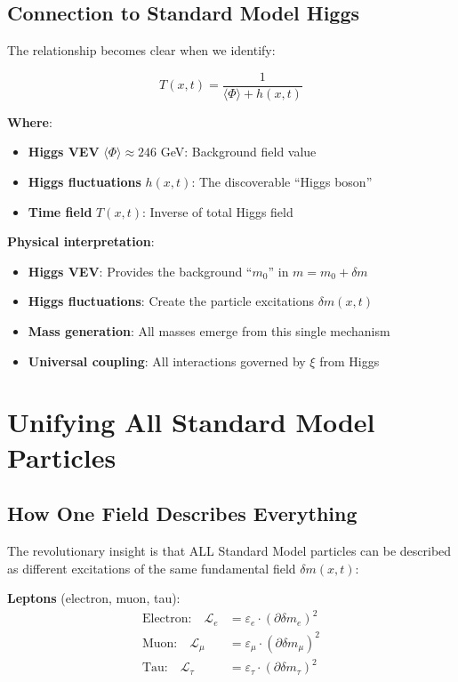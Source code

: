 \documentclass[12pt,a4paper]{article}
\newcommand{\Lag}{\mathcal{L}}
\newcommand{\deltam}{\delta m}
\newcommand{\xipar}{\xi}
\theoremstyle{definition}
\theoremstyle{remark}
\begin{document}
	\subsection{Connection to Standard Model Higgs}
	
	The relationship becomes clear when we identify:
	
	\begin{equation}
		T(x,t) = \frac{1}{\langle\Phi\rangle + h(x,t)}
	\end{equation}
	
	\textbf{Where}:
	\begin{itemize}
		\item \textbf{Higgs VEV} $\langle\Phi\rangle \approx 246$ GeV: Background field value
		\item \textbf{Higgs fluctuations} $h(x,t)$: The discoverable ``Higgs boson''
		\item \textbf{Time field} $T(x,t)$: Inverse of total Higgs field
	\end{itemize}
	
	\textbf{Physical interpretation}:
	\begin{itemize}
		\item \textbf{Higgs VEV}: Provides the background ``$m_0$'' in $m = m_0 + \deltam$
		\item \textbf{Higgs fluctuations}: Create the particle excitations $\deltam(x,t)$
		\item \textbf{Mass generation}: All masses emerge from this single mechanism
		\item \textbf{Universal coupling}: All interactions governed by $\xipar$ from Higgs
	\end{itemize}
	
	\section{Unifying All Standard Model Particles}
	
	\subsection{How One Field Describes Everything}
	
	The revolutionary insight is that ALL Standard Model particles can be described as different excitations of the same fundamental field $\deltam(x,t)$:
	
	\textbf{Leptons} (electron, muon, tau):
	\begin{align}
		\text{Electron:} \quad \Lag_e &= \varepsilon_e \cdot (\partial \deltam_e)^2 \\
		\text{Muon:} \quad \Lag_{\mu} &= \varepsilon_{\mu} \cdot (\partial \deltam_{\mu})^2 \\
		\text{Tau:} \quad \Lag_{\tau} &= \varepsilon_{\tau} \cdot (\partial \deltam_{\tau})^2
	\end{align}
	
\end{document}
